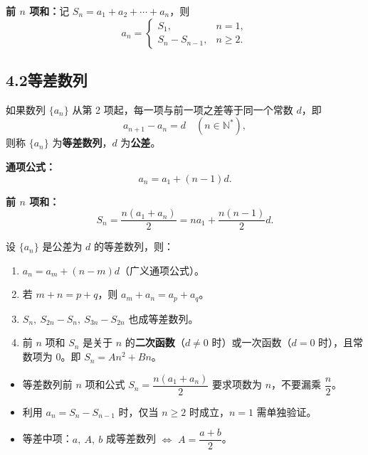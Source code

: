 \documentclass[12pt, a4paper]{ctexart}
\begin{document}
\noindent\textbf{前 $n$ 项和：}记 $S_n = a_1 + a_2 + \cdots + a_n$，则
\[
  a_n = \begin{cases} S_1, & n = 1,\\[4pt] S_n - S_{n-1}, & n \geqslant 2. \end{cases}
\]

\subsection*{4.2\quad 等差数列}

\begin{knowledgebox}[定义]
如果数列 $\{a_n\}$ 从第 2 项起，每一项与前一项之差等于同一个常数 $d$，即
\[
  a_{n+1} - a_n = d \quad (n \in \mathbb{N}^*),
\]
则称 $\{a_n\}$ 为\textbf{等差数列}，$d$ 为\textbf{公差}。
\end{knowledgebox}

\medskip

\noindent\textbf{通项公式：}
\[
  a_n = a_1 + (n-1)d.
\]

\noindent\textbf{前 $n$ 项和：}
\[
  S_n = \frac{n(a_1 + a_n)}{2} = na_1 + \frac{n(n-1)}{2}d.
\]

\begin{tipbox}[等差数列的性质]
设 $\{a_n\}$ 是公差为 $d$ 的等差数列，则：
\begin{enumerate}[label=(\arabic*)]
  \item $a_n = a_m + (n - m)d$（广义通项公式）。
  \item 若 $m + n = p + q$，则 $a_m + a_n = a_p + a_q$。
  \item $S_n,\ S_{2n} - S_n,\ S_{3n} - S_{2n}$ 也成等差数列。
  \item 前 $n$ 项和 $S_n$ 是关于 $n$ 的\textbf{二次函数}（$d \neq 0$ 时）或一次函数（$d = 0$ 时），且常数项为 $0$。即 $S_n = An^2 + Bn$。
\end{enumerate}
\end{tipbox}

\begin{warnbox}[易错提醒]
\begin{itemize}
  \item 等差数列前 $n$ 项和公式 $S_n = \dfrac{n(a_1 + a_n)}{2}$ 要求项数为 $n$，不要漏乘 $\dfrac{n}{2}$。
  \item 利用 $a_n = S_n - S_{n-1}$ 时，仅当 $n \geqslant 2$ 时成立，$n = 1$ 需单独验证。
  \item 等差中项：$a,\ A,\ b$ 成等差数列 $\Longleftrightarrow$ $A = \dfrac{a+b}{2}$。
\end{itemize}
\end{warnbox}
\end{document}
